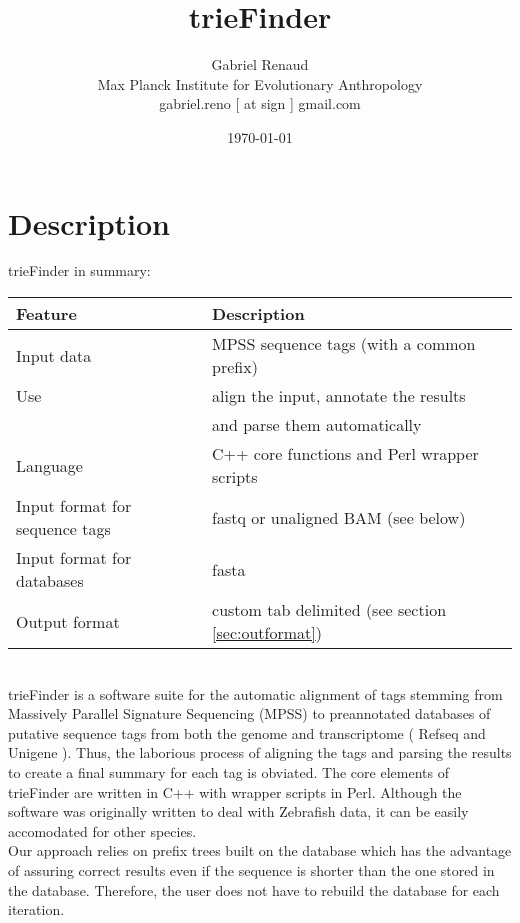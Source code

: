 \documentclass[a4paper,12pt]{article}
\begin{document}
\title{trieFinder}
\author{Gabriel Renaud \\ \footnotesize{ Max Planck Institute for Evolutionary Anthropology} \\ \footnotesize{gabriel.reno [ at sign ] gmail.com}}
\date{\today}
\maketitle

\tableofcontents

\clearpage
\section{Description}


trieFinder in summary: \\

\begin{tabular}{ll}
\hline
Feature & Description \\
\hline
Input data &  MPSS sequence tags (with a common prefix) \\
Use & align the input, annotate the results \\
 & and parse them automatically \\
Language & C++ core functions and Perl wrapper scripts \\
Input format for sequence tags & fastq or unaligned BAM (see below) \\
Input format for databases & fasta \\
Output format  & custom tab delimited (see section \ref{sec:outformat}) \\
\hline
\end{tabular}
\\

trieFinder is a software suite for the automatic alignment of tags stemming from Massively Parallel Signature Sequencing (MPSS) to preannotated databases of putative sequence tags from both the genome and transcriptome ( Refseq and Unigene ). Thus, the laborious process of aligning the tags and parsing the results to create a final summary for each tag is obviated. The core elements of trieFinder are written in C++ with wrapper scripts in Perl. Although the software was originally written to deal with Zebrafish data, it can be easily accomodated for other species.  \\

Our approach relies on prefix trees built on the database which has the advantage of assuring correct results even if the sequence is shorter than the one stored in the database. Therefore, the user does not have to rebuild the database for each iteration. \\
\end{document}
